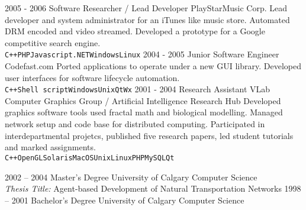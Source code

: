 \documentclass[9pt]{developercv} %
\begin{document}
\begin{entrylist}
	\entry
		{2005 - 2006}
		{Software Researcher / Lead Developer}
		{PlayStarMusic Corp.}
		{Lead developer and system administrator for an iTunes like music store. Automated DRM encoded and video streamed. Developed a prototype for a Google competitive search engine.
\\ \texttt{C++}\slashsep\texttt{PHP}\slashsep\texttt{Javascript}\slashsep\texttt{.NET}\slashsep\texttt{Windows}\slashsep\texttt{Linux}}
	\entry
		{2004 - 2005}
		{Junior Software Engineer}
		{Codefast.com }
		{Ported applications to operate under a new GUI library. Developed user interfaces for software lifecycle automation.\\ \texttt{C++}\slashsep\texttt{Shell script}\slashsep\texttt{Windows}\slashsep\texttt{Unix}\slashsep\texttt{Qt}\slashsep\texttt{Wx}}
	\entry
		{2001 - 2004}
		{Research Assistant}
		{VLab Computer Graphics Group / Artificial Intelligence Research Hub}
		{Developed graphics software tools used fractal math and biological modelling. Managed network setup and code base for distributed computing. Participated in interdepartmental projetcs, published five research papers, led student tutorials and marked assignments.\\ \texttt{C++}\slashsep\texttt{OpenGL}\slashsep\texttt{Solaris}\slashsep\texttt{MacOS}\slashsep\texttt{Unix}\slashsep\texttt{Linux}\slashsep\texttt{PHP}\slashsep\texttt{MySQL}\slashsep\texttt{Qt}}
\end{entrylist}



\begin{entrylist}
	\entry
		{2002 -- 2004}
		{Master's Degree}
		{University of Calgary}
		{Computer Science\\\footnotesize{{\sl Thesis Title:} Agent-based Development of Natural Transportation Networks}}
	\entry
		{1998 -- 2001}
		{Bachelor's Degree}
		{University of Calgary}
		{Computer Science}
\end{entrylist}

\end{document}
